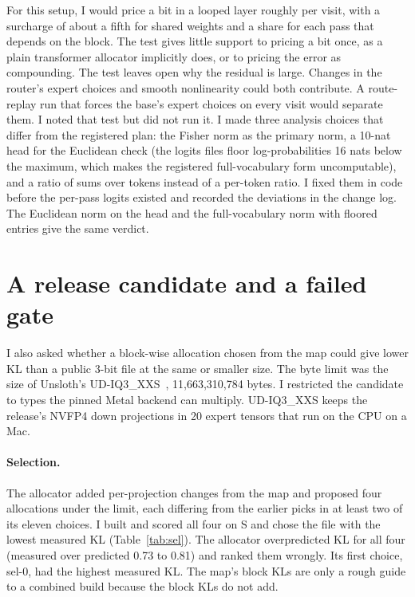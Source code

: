 \documentclass[11pt,a4paper]{article}
\begin{document}
For this setup, I would price a bit in a looped layer roughly per visit, with a surcharge of about a fifth for shared weights and a share for each pass that depends on the block. The test gives little support to pricing a bit once, as a plain transformer allocator implicitly does, or to pricing the error as compounding. The test leaves open why the residual is large. Changes in the router's expert choices and smooth nonlinearity could both contribute. A route-replay run that forces the base's expert choices on every visit would separate them. I noted that test but did not run it. I made three analysis choices that differ from the registered plan: the Fisher norm as the primary norm, a 10-nat head for the Euclidean check (the logits files floor log-probabilities 16 nats below the maximum, which makes the registered full-vocabulary form uncomputable), and a ratio of sums over tokens instead of a per-token ratio. I fixed them in code before the per-pass logits existed and recorded the deviations in the change log. The Euclidean norm on the head and the full-vocabulary norm with floored entries give the same verdict.

\section{A release candidate and a failed gate}
\label{sec:release}

I also asked whether a block-wise allocation chosen from the map could give lower KL than a public 3-bit file at the same or smaller size. The byte limit was the size of Unsloth's UD-IQ3\_XXS~\citep{unslothgguf}, 11,663,310,784 bytes. I restricted the candidate to types the pinned Metal backend can multiply. UD-IQ3\_XXS keeps the release's NVFP4 down projections in 20 expert tensors that run on the CPU on a Mac.

\paragraph{Selection.} The allocator added per-projection changes from the map and proposed four allocations under the limit, each differing from the earlier picks in at least two of its eleven choices. I built and scored all four on S and chose the file with the lowest measured KL (Table~\ref{tab:sel}). The allocator overpredicted KL for all four (measured over predicted 0.73 to 0.81) and ranked them wrongly. Its first choice, sel-0, had the highest measured KL. The map's block KLs are only a rough guide to a combined build because the block KLs do not add.
\end{document}
